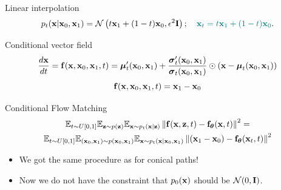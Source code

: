 \begin{frame}{Linear interpolation}
	\vspace{-0.3cm}
	\[
		p_t(\mathbf{x} | \mathbf{x}_0, \mathbf{x}_1) = \mathcal{N}\left(t \mathbf{x}_1 + (1 - t) \mathbf{x}_0, \epsilon^2 \mathbf{I}\right); \quad {\color{teal}\mathbf{x}_t = t \mathbf{x}_1 + (1 - t) \mathbf{x}_0}. 
	\]
	\vspace{-0.5cm}
	\begin{block}{Conditional vector field}
		\vspace{-0.5cm}
		\[
			 \frac{d\mathbf{x}}{dt} = \mathbf{f}(\mathbf{x}, \mathbf{x}_0, \mathbf{x}_1, t) =  \boldsymbol{\mu}_t'(\mathbf{x}_0, \mathbf{x}_1) + \frac{\boldsymbol{\sigma}_t'(\mathbf{x}_0, \mathbf{x}_1)}{\boldsymbol{\sigma}_t(\mathbf{x}_0, \mathbf{x}_1)} \odot (\mathbf{x} - \boldsymbol{\mu}_t(\mathbf{x}_0, \mathbf{x}_1))
		\]
		\vspace{-0.5cm}
		\[
			\mathbf{f}(\mathbf{x}, \mathbf{x}_0, \mathbf{x}_1, t) = \mathbf{x}_1 - \mathbf{x}_0
		\]
		\vspace{-0.7cm}
	\end{block}
	\begin{block}{Conditional Flow Matching}
		\vspace{-0.7cm}
		\begin{multline*}
			\mathbb{E}_{t \sim U[0, 1]} \mathbb{E}_{\mathbf{z} \sim p(\mathbf{z})} \mathbb{E}_{\mathbf{x} \sim p_t(\mathbf{x} | \mathbf{z})}\left\| \mathbf{f}(\mathbf{x}, \mathbf{z}, t) - \mathbf{f}_{\boldsymbol{\theta}}(\mathbf{x}, t) \right\|^2 = \\
		 \mathbb{E}_{t \sim U[0, 1]} \mathbb{E}_{(\mathbf{x}_0, \mathbf{x}_1) \sim p(\mathbf{x}_0, \mathbf{x}_1)} \mathbb{E}_{\mathbf{x} \sim p_t(\mathbf{x} | \mathbf{x}_0, \mathbf{x}_1)} \left\| (\mathbf{x}_1 - \mathbf{x}_0) - \mathbf{f}_{\boldsymbol{\theta}}(\mathbf{x}_t, t) \right\|^2
		\end{multline*}
		\vspace{-0.5cm}
	\end{block}	
	\begin{itemize}
		\item We got the same procedure as for conical paths!
		\item Now we do not have the constraint that $p_0(\mathbf{x})$ should be $\mathcal{N}(0, \mathbf{I})$.
	\end{itemize} 
\end{frame}
